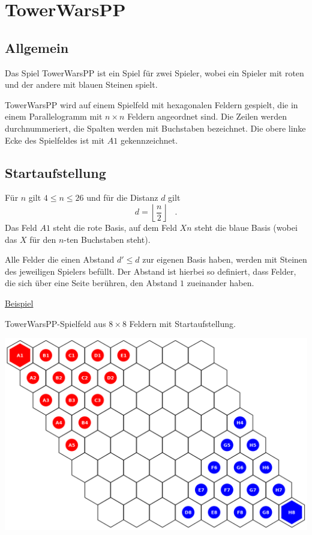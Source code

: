 \section*{TowerWarsPP}
\newcommand{\myAlph}[1]{\char\numexpr`A-1+#1\relax}
\newcommand{\myalph}[1]{\char\numexpr`a-1+#1\relax}

\subsection*{Allgemein}
Das Spiel TowerWarsPP ist ein Spiel für zwei Spieler, wobei ein Spieler mit roten und der andere mit blauen Steinen spielt.

TowerWarsPP wird auf einem Spielfeld mit hexagonalen Feldern gespielt, die in einem Parallelogramm mit $n \times n$ Feldern angeordnet sind. Die Zeilen werden durchnummeriert, die Spalten werden mit Buchstaben bezeichnet. Die obere linke Ecke des Spielfeldes ist mit $A1$ gekennzeichnet.

\subsection*{Startaufstellung}
Für $n$ gilt $4 \le n \le 26$ und für die Distanz $d$ gilt 
\[d = \left\lfloor \frac{n}{2}\right\rfloor\hspace{10pt}.\] 
Das Feld $A1$ steht die rote Basis, auf dem Feld $Xn$ steht die blaue Basis (wobei das $X$ für den $n$-ten Buchstaben steht). 

Alle Felder die einen Abstand $d' \le d$ zur eigenen Basis haben, werden mit Steinen des jeweiligen Spielers befüllt. Der Abstand ist hierbei so definiert, dass Felder, die sich über eine Seite berühren, den Abstand $1$ zueinander haben.

\underline{Beispiel}

TowerWarsPP-Spielfeld aus $8 \times 8$ Feldern mit Startaufstellung.
\begin{center}
\includegraphics[scale=0.25]{graphic/start8.png}
\end{center}

